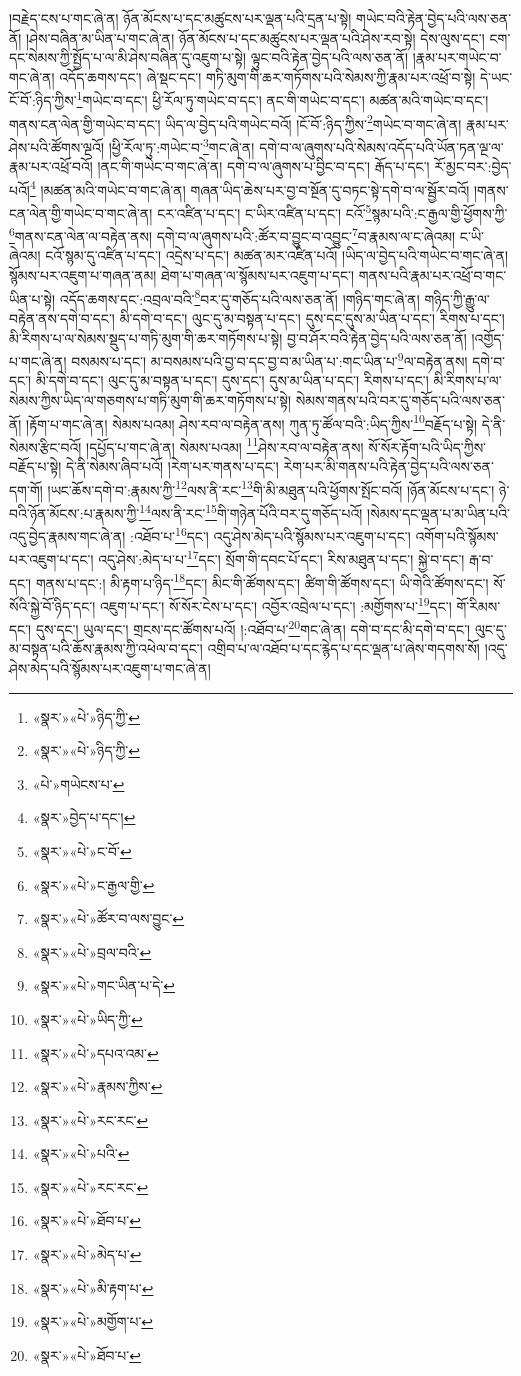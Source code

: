།བརྗེད་ངས་པ་གང་ཞེ་ན། ཉོན་མོངས་པ་དང་མཚུངས་པར་ལྡན་པའི་དྲན་པ་སྟེ། གཡེང་བའི་རྟེན་བྱེད་པའི་ལས་ཅན་ནོ། །ཤེས་བཞིན་མ་ཡིན་པ་གང་ཞེ་ན། ཉོན་མོངས་པ་དང་མཚུངས་པར་ལྡན་པའི་ཤེས་རབ་སྟེ། དེས་ལུས་དང་། ངག་དང་སེམས་ཀྱི་སྤྱོད་པ་ལ་མི་ཤེས་བཞིན་དུ་འཇུག་པ་སྟེ། ལྟུང་བའི་རྟེན་བྱེད་པའི་ལས་ཅན་ནོ། །རྣམ་པར་གཡེང་བ་གང་ཞེ་ན། འདོད་ཆགས་དང་། ཞེ་སྡང་དང་། གཏི་མུག་གི་ཆར་གཏོགས་པའི་སེམས་ཀྱི་རྣམ་པར་འཕྲོ་བ་སྟེ། དེ་ཡང་ངོ་བོ་:ཉིད་ཀྱིས་\footnote{«སྣར་»«པེ་»ཉིད་ཀྱི་}གཡེང་བ་དང་། ཕྱི་རོལ་ཏུ་གཡེང་བ་དང་། ནང་གི་གཡེང་བ་དང་། མཚན་མའི་གཡེང་བ་དང་། གནས་ངན་ལེན་གྱི་གཡེང་བ་དང་། ཡིད་ལ་བྱེད་པའི་གཡེང་བའོ། །ངོ་བོ་:ཉིད་ཀྱིས་\footnote{«སྣར་»«པེ་»ཉིད་ཀྱི་}གཡེང་བ་གང་ཞེ་ན། རྣམ་པར་ཤེས་པའི་ཚོགས་ལྔའོ། །ཕྱི་རོལ་ཏུ་:གཡེང་བ་\footnote{«པེ་»གཡེངས་པ་}གང་ཞེ་ན། དགེ་བ་ལ་ཞུགས་པའི་སེམས་འདོད་པའི་ཡོན་ཏན་ལྔ་ལ་རྣམ་པར་འཕྲོ་བའོ། །ནང་གི་གཡེང་བ་གང་ཞེ་ན། དགེ་བ་ལ་ཞུགས་པ་བྱིང་བ་དང་། རྒོད་པ་དང་། རོ་མྱང་བར་:བྱེད་པའོ།\footnote{«སྣར་»བྱེད་པ་དང་།} །མཚན་མའི་གཡེང་བ་གང་ཞེ་ན། གཞན་ཡིད་ཆེས་པར་བྱ་བ་སྔོན་དུ་བཏང་སྟེ་དགེ་བ་ལ་སྦྱོར་བའོ། །གནས་ངན་ལེན་གྱི་གཡེང་བ་གང་ཞེ་ན། ངར་འཛིན་པ་དང་། ང་ཡིར་འཛིན་པ་དང་། ངའོ་\footnote{«སྣར་»«པེ་»ང་བོ་}སྙམ་པའི་:ང་རྒྱལ་གྱི་ཕྱོགས་ཀྱི་\footnote{«སྣར་»«པེ་»ང་རྒྱལ་གྱི་}གནས་ངན་ལེན་ལ་བརྟེན་ནས། དགེ་བ་ལ་ཞུགས་པའི་:ཚོར་བ་བྱུང་བ་འབྱུང་\footnote{«སྣར་»«པེ་»ཚོར་བ་ལས་བྱུང་}བ་རྣམས་ལ་ང་ཞེའམ། ང་ཡི་ཞེའམ། ངའོ་སྙམ་དུ་འཛིན་པ་དང་། འདྲེས་པ་དང་། མཚན་མར་འཛིན་པའོ། །ཡིད་ལ་བྱེད་པའི་གཡེང་བ་གང་ཞེ་ན། སྙོམས་པར་འཇུག་པ་གཞན་ནམ། ཐེག་པ་གཞན་ལ་སྙོམས་པར་འཇུག་པ་དང་། གནས་པའི་རྣམ་པར་འཕྲོ་བ་གང་ཡིན་པ་སྟེ། འདོད་ཆགས་དང་:འབྲལ་བའི་\footnote{«སྣར་»«པེ་»བྲལ་བའི་}བར་དུ་གཅོད་པའི་ལས་ཅན་ནོ། །གཉིད་གང་ཞེ་ན། གཉིད་ཀྱི་རྒྱུ་ལ་བརྟེན་ནས་དགེ་བ་དང་། མི་དགེ་བ་དང་། ལུང་དུ་མ་བསྟན་པ་དང་། དུས་དང་དུས་མ་ཡིན་པ་དང་། རིགས་པ་དང་། མི་རིགས་པ་ལ་སེམས་སྡུད་པ་གཏི་མུག་གི་ཆར་གཏོགས་པ་སྟེ། བྱ་བ་ཤོར་བའི་རྟེན་བྱེད་པའི་ལས་ཅན་ནོ། །འགྱོད་པ་གང་ཞེ་ན། བསམས་པ་དང་། མ་བསམས་པའི་བྱ་བ་དང་བྱ་བ་མ་ཡིན་པ་:གང་ཡིན་པ་\footnote{«སྣར་»«པེ་»གང་ཡིན་པ་དེ་}ལ་བརྟེན་ནས། དགེ་བ་དང་། མི་དགེ་བ་དང་། ལུང་དུ་མ་བསྟན་པ་དང་། དུས་དང་། དུས་མ་ཡིན་པ་དང་། རིགས་པ་དང་། མི་རིགས་པ་ལ་སེམས་ཀྱིས་ཡིད་ལ་གཅགས་པ་གཏི་མུག་གི་ཆར་གཏོགས་པ་སྟེ། སེམས་གནས་པའི་བར་དུ་གཅོད་པའི་ལས་ཅན་ནོ། །རྟོག་པ་གང་ཞེ་ན། སེམས་པའམ། ཤེས་རབ་ལ་བརྟེན་ནས། ཀུན་ཏུ་ཚོལ་བའི་:ཡིད་ཀྱིས་\footnote{«སྣར་»«པེ་»ཡིད་ཀྱི་}བརྗོད་པ་སྟེ། དེ་ནི་སེམས་རྩིང་བའོ། །དཔྱོད་པ་གང་ཞེ་ན། སེམས་པའམ། \footnote{«སྣར་»«པེ་»དཔའ་འམ་}ཤེས་རབ་ལ་བརྟེན་ནས། སོ་སོར་རྟོག་པའི་ཡིད་ཀྱིས་བརྗོད་པ་སྟེ། དེ་ནི་སེམས་ཞིབ་པའོ། །རེག་པར་གནས་པ་དང་། རེག་པར་མི་གནས་པའི་རྟེན་བྱེད་པའི་ལས་ཅན་དག་གོ། །ཡང་ཆོས་དགེ་བ་:རྣམས་ཀྱི་\footnote{«སྣར་»«པེ་»རྣམས་ཀྱིས་}ལས་ནི་རང་\footnote{«སྣར་»«པེ་»རང་རང་}གི་མི་མཐུན་པའི་ཕྱོགས་སྤོང་བའོ། །ཉོན་མོངས་པ་དང་། ཉེ་བའི་ཉོན་མོངས་:པ་རྣམས་ཀྱི་\footnote{«སྣར་»«པེ་»པའི་}ལས་ནི་རང་\footnote{«སྣར་»«པེ་»རང་རང་}གི་གཉེན་པོའི་བར་དུ་གཅོད་པའོ། །སེམས་དང་ལྡན་པ་མ་ཡིན་པའི་འདུ་བྱེད་རྣམས་གང་ཞེ་ན། :འཐོབ་པ་\footnote{«སྣར་»«པེ་»ཐོབ་པ་}དང་། འདུ་ཤེས་མེད་པའི་སྙོམས་པར་འཇུག་པ་དང་། འགོག་པའི་སྙོམས་པར་འཇུག་པ་དང་། འདུ་ཤེས་:མེད་པ་པ་\footnote{«སྣར་»«པེ་»མེད་པ་}དང་། སྲོག་གི་དབང་པོ་དང་། རིས་མཐུན་པ་དང་། སྐྱེ་བ་དང་། རྒ་བ་དང་། གནས་པ་དང་:། མི་རྟག་པ་ཉིད་\footnote{«སྣར་»«པེ་»མི་རྟག་པ་}དང་། མིང་གི་ཚོགས་དང་། ཚིག་གི་ཚོགས་དང་། ཡི་གེའི་ཚོགས་དང་། སོ་སོའི་སྐྱེ་བོ་ཉིད་དང་། འཇུག་པ་དང་། སོ་སོར་ངེས་པ་དང་། འབྱོར་འབྲེལ་པ་དང་། :མགྱོགས་པ་\footnote{«སྣར་»«པེ་»མགྱོག་པ་}དང་། གོ་རིམས་དང་། དུས་དང་། ཡུལ་དང་། གྲངས་དང་ཚོགས་པའོ། །:འཐོབ་པ་\footnote{«སྣར་»«པེ་»ཐོབ་པ་}གང་ཞེ་ན། དགེ་བ་དང་མི་དགེ་བ་དང་། ལུང་དུ་མ་བསྟན་པའི་ཆོས་རྣམས་ཀྱི་འཕེལ་བ་དང་། འགྲིབ་པ་ལ་འཐོབ་པ་དང་རྙེད་པ་དང་ལྡན་པ་ཞེས་གདགས་སོ། །འདུ་ཤེས་མེད་པའི་སྙོམས་པར་འཇུག་པ་གང་ཞེ་ན། 